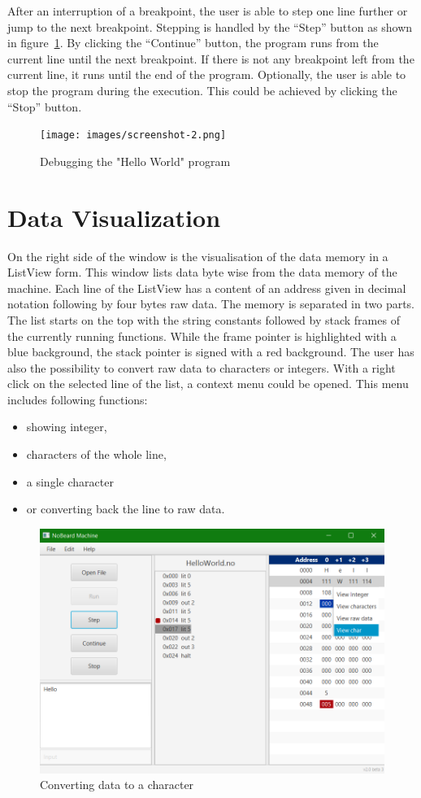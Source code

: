 After an interruption of a breakpoint, the user is able to step one line further or jump to the next breakpoint. Stepping is handled by the “Step” button as shown in figure~\ref{fig:debugging}. By clicking the “Continue” button, the program runs from the current line until the next breakpoint. If there is not any breakpoint left from the current line, it runs until the end of the program. Optionally, the user is able to stop the program during the execution. This could be achieved by clicking the “Stop” button.
\begin{figure}[h] 
	\centering
	\texttt{[image: images/screenshot-2.png]}
	\caption{Debugging the "Hello World" program}
	\label{fig:debugging}
\end{figure}

\section{Data Visualization}
On the right side of the window is the visualisation of the data memory in a ListView form. This window lists data byte wise from the data memory of the machine. Each line of the ListView has a content of an address given in decimal notation following by four bytes raw data. The memory is separated in two parts. The list starts on the top with the string constants followed by stack frames of the currently running functions. While the frame pointer is highlighted with a blue background, the stack pointer is signed with a red background. The user has also the possibility to convert raw data to characters or integers.
With a right click on the selected line of the list, a context menu could be opened. This menu includes following functions:
\begin{itemize}
\item showing integer,
\item characters of the whole line, 
\item a single character 
\item or converting back the line to raw data. 
\end{itemize}
\begin{figure}[h] 
	\centering
	\includegraphics[scale=.60]{images/screenshot-3.png}
	\caption{Converting data to a character}
	\label{fig:convertToChar}
\end{figure}
